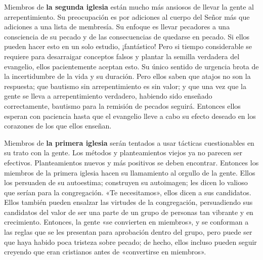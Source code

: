 \documentclass[12pt, twoside, openright]{book}
\begin{document}
Miembros de \textbf{la segunda iglesia} están mucho más ansiosos de llevar la gente al arrepentimiento. Su preocupación es por adiciones al cuerpo del Señor más que adiciones a una lista de membresía. Su enfoque es llevar pecadores a una consciencia de su pecado y de las consecuencias de quedarse en pecado. Si ellos pueden hacer esto en un solo estudio, ¡fantástico! Pero si tiempo considerable se requiere para desarraigar conceptos falsos y plantar la semilla verdadera del evangelio, ellos pacientemente aceptan esto. Su único sentido de urgencia brota de la incertidumbre de la vida y su duración. Pero ellos saben que atajos no son la respuesta; que bautismo sin arrepentimiento es sin valor; y que una vez que la gente se lleva a arrepentimiento verdadero, habiendo sido enseñado correctamente, bautismo para la remisión de pecados seguirá. Entonces ellos esperan con paciencia hasta que el evangelio lleve a cabo su efecto deseado en los corazones de los que ellos enseñan. 

Miembros de \textbf{la primera iglesia} serán tentados a usar tácticas cuestionables en su trato con la gente. Los métodos y planteamientos viejos ya no parecen ser efectivos. Planteamientos nuevos y más positivos se deben encontrar. Entonces los miembros de la primera iglesia hacen su llamamiento al orgullo de la gente. Ellos los persuaden de su autoestima; construyen su autoimagen; les dicen lo valioso que serían para la congregación. «Te necesitamos», ellos dicen a sus candidatos. Ellos también pueden ensalzar las virtudes de la congregación, persuadiendo sus candidatos del valor de ser una parte de un grupo de personas tan vibrante y en crecimiento. Entonces, la gente «se convierten en miembros», y se conforman a las reglas que se les presentan para aprobación dentro del grupo, pero puede ser que haya habido poca tristeza sobre pecado; de hecho, ellos incluso pueden seguir creyendo que eran cristianos antes de «convertirse en miembros». 
\end{document}
